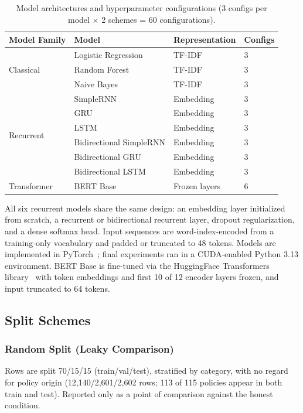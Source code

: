 \documentclass[11pt]{article}
\begin{document}
\begin{table}[t]
\centering
\begin{tabular}{@{}llll@{}}
\toprule
\textbf{Model Family} & \textbf{Model} & \textbf{Representation} & \textbf{Configs} \\
\midrule
\multirow{3}{*}{Classical} & Logistic Regression & TF-IDF & 3 \\
 & Random Forest & TF-IDF & 3 \\
 & Naive Bayes & TF-IDF & 3 \\
\midrule
\multirow{6}{*}{Recurrent} & SimpleRNN & Embedding & 3 \\
 & GRU & Embedding & 3 \\
 & LSTM & Embedding & 3 \\
 & Bidirectional SimpleRNN & Embedding & 3 \\
 & Bidirectional GRU & Embedding & 3 \\
 & Bidirectional LSTM & Embedding & 3 \\
\midrule
Transformer & BERT Base & Frozen layers & 6 \\
\bottomrule
\end{tabular}
\caption{Model architectures and hyperparameter configurations (3 configs per model $\times$ 2 schemes = 60 configurations).}
\label{tab:models}
\end{table}

All six recurrent models share the same design: an embedding layer initialized from scratch, a recurrent or bidirectional recurrent layer, dropout regularization, and a dense softmax head. Input sequences are word-index-encoded from a training-only vocabulary and padded or truncated to 48 tokens. Models are implemented in PyTorch~\cite{paszke-etal-2019-pytorch}; final experiments ran in a CUDA-enabled Python 3.13 environment. BERT Base is fine-tuned via the HuggingFace Transformers library~\cite{wolf-etal-2020-transformers} with token embeddings and first 10 of 12 encoder layers frozen, and input truncated to 64 tokens.

\subsection{Split Schemes}

\subsubsection{Random Split (Leaky Comparison)}

Rows are split 70/15/15 (train/val/test), stratified by category, with no regard for policy origin (12,140/2,601/2,602 rows; 113 of 115 policies appear in both train and test). Reported only as a point of comparison against the honest condition.
\end{document}
